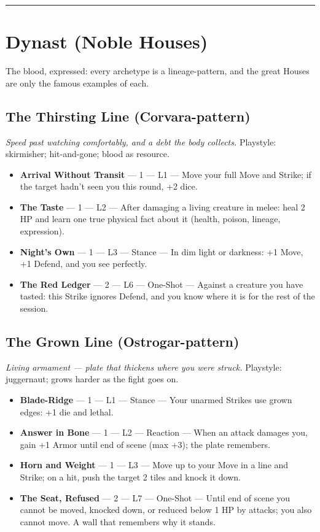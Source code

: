\medskip\hrule\medskip

\section{Dynast \textnormal{(Noble Houses)}}

The blood, expressed: every archetype is a lineage-pattern, and the great Houses are only the famous examples of each.

\subsection{The Thirsting Line \textnormal{(Corvara-pattern)}}
\textit{Speed past watching comfortably, and a debt the body collects.} Playstyle: skirmisher; hit-and-gone; blood as resource.
\begin{itemize}
    \item \textbf{Arrival Without Transit} --- 1 --- L1 --- Move your full Move and Strike; if the target hadn't seen you this round, +2 dice.
    \item \textbf{The Taste} --- 1 --- L2 --- After damaging a living creature in melee: heal 2 HP and learn one true physical fact about it (health, poison, lineage, expression).
    \item \textbf{Night's Own} --- 1 --- L3 --- Stance --- In dim light or darkness: +1 Move, +1 Defend, and you see perfectly.
    \item \textbf{The Red Ledger} --- 2 --- L6 --- One-Shot --- Against a creature you have tasted: this Strike ignores Defend, and you know where it is for the rest of the session.
\end{itemize}

\subsection{The Grown Line \textnormal{(Ostrogar-pattern)}}
\textit{Living armament --- plate that thickens where you were struck.} Playstyle: juggernaut; grows harder as the fight goes on.
\begin{itemize}
    \item \textbf{Blade-Ridge} --- 1 --- L1 --- Stance --- Your unarmed Strikes use grown edges: +1 die and lethal.
    \item \textbf{Answer in Bone} --- 1 --- L2 --- Reaction --- When an attack damages you, gain +1 Armor until end of scene (max +3); the plate remembers.
    \item \textbf{Horn and Weight} --- 1 --- L3 --- Move up to your Move in a line and Strike; on a hit, push the target 2 tiles and knock it down.
    \item \textbf{The Seat, Refused} --- 2 --- L7 --- One-Shot --- Until end of scene you cannot be moved, knocked down, or reduced below 1 HP by attacks; you also cannot move. A wall that remembers why it stands.
\end{itemize}


